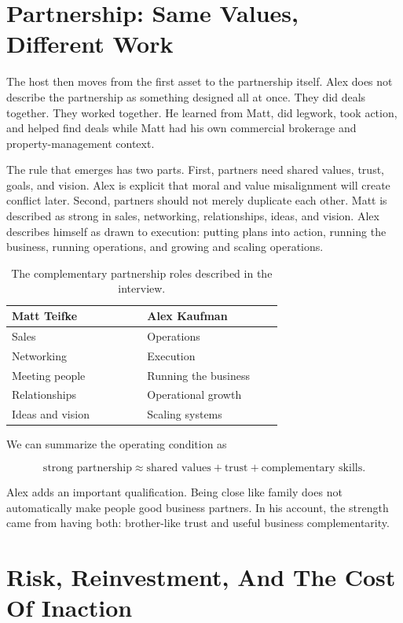 \section{Partnership: Same Values, Different Work}

The host then moves from the first asset to the partnership itself. Alex does not describe the partnership as something designed all at once. They did deals together. They worked together. He learned from Matt, did legwork, took action, and helped find deals while Matt had his own commercial brokerage and property-management context.

The rule that emerges has two parts. First, partners need shared values, trust, goals, and vision. Alex is explicit that moral and value misalignment will create conflict later. Second, partners should not merely duplicate each other. Matt is described as strong in sales, networking, relationships, ideas, and vision. Alex describes himself as drawn to execution: putting plans into action, running the business, running operations, and growing and scaling operations.

\begin{table}
\centering
\begin{tabular}{|p{0.42\linewidth}|p{0.42\linewidth}|}
\hline
Matt Teifke & Alex Kaufman \\
\hline
Sales & Operations \\
Networking & Execution \\
Meeting people & Running the business \\
Relationships & Operational growth \\
Ideas and vision & Scaling systems \\
\hline
\end{tabular}
\caption{The complementary partnership roles described in the interview.}
\end{table}

We can summarize the operating condition as

\begin{equation}
\text{strong partnership}
\approx
\text{shared values}
+
\text{trust}
+
\text{complementary skills}.
\end{equation}

Alex adds an important qualification. Being close like family does not automatically make people good business partners. In his account, the strength came from having both: brother-like trust and useful business complementarity.

\section{Risk, Reinvestment, And The Cost Of Inaction}

